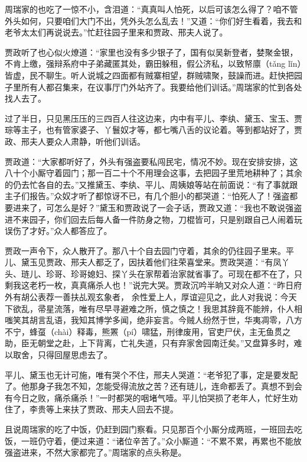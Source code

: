 \documentclass[12pt,oneside]{book}
\begin{document}
周瑞家的也吃了一惊不小，含泪道：“真真叫人怕死，以后可该怎么得了？咱不管外头如何，只要咱们大门不出，凭外头怎么乱去！”又道：“你们好生看着，我去和老爷太太们再说说去。”忙赶往园子里来和贾政、邢夫人说了。

贾政听了也心似火燎道：“家里也没有多少银子了，国有似吴新登者，婪聚金银，不肯上缴，强辩系府中子弟藏匿其处，霸田躲租，假公济私，以致帑廪（tǎng lǐn）皆虚，民不聊生。听人说城之四面都有贼寨相望，群贼啸聚，鼓譟而进。赶快把园子里所有人都召集来，在议事厅门外站齐了。我要给他们训话。”周瑞家的忙到各处找人去了。

过了半日，只见黑压压的三四百人往这边来，内中有平儿、李纨、黛玉、宝玉、贾琮等主子，也有管家婆子、丫鬟奴才等，都七嘴八舌的议论着。等到都站好了，贾政、邢夫人要众人肃静，听他们训话。

贾政道：“大家都听好了，外头有强盗要私闯民宅，情况不妙。现在安排安排，这八十个小厮守着园门；那一百二十个不用理会这事，去把园子里荒地耕种了；其余的仍去忙各自的去。”又推黛玉、李纨、平儿、周姨娘等站在前面说：“有了事就跟主子们报告。”众奴才听了都惊讶不已，有几个胆小的都哭道：“怕死人了！强盗都要进来了，可怎么是好？”黛玉和贾政说了一会子话，贾政又道：“我也不敢说强盗进不来园子，你们回去后每人备一件防身之物，刀棍皆可，只是别跟自己人闹着玩误伤了才好。”众人都答应了。

贾政一声令下，众人散开了。那八十个自去园门守着，其余的仍往园子里来。平儿、黛玉见贾政、邢夫人都乏了，因扶着他们往荣喜堂来。贾政哭道：“有凤丫头、琏儿、珍哥、珍哥媳妇、探丫头在家帮着治家就省事了。可现在都不在了，只剩我这老朽一枚，真真痛杀人也！”说完大哭。贾政沉吟半晌又对众人道：“昨日府外有胡公表荐一善扶乩观玄象者， 余性爱上人，厚谊迎见之，此人对我说：今天下欲乱，帚星流落，唯有尽早寻避难之所，慎之慎之！我思其辞竟不能辨，仆人相嗤笑其胡言乱语，我知其博学多闻，绝非妄言。今贼人纷然于世，华夷凋零，八方不宁，蜂虿（chài）释毒，熊罴（pí）啸猛，刑律废用，官吏尸伏，主无鱼贯之助，臣无朝堂之赴，上下背离，亡礼失道，只有弃家舍园南迁矣。”又盘算多时，难以取舍，只得回屋思虑去了。

平儿、黛玉也无计可施，唯有哭个不住，邢夫人哭道：“老爷犯了事，定是要发配了。他那身子我怎不知，怎能受得流放之苦？还有琏儿，连命都丢了。真想不到会有今日之败，痛杀痛杀！”一时都哭的咽堵气噎。平儿怕哭损了老年人，忙好生劝住了，李贵等上来扶了贾政、邢夫人回去不提。

且说周瑞家的吃了中饭，仍赶到园门察看。只见那百个小厮分成两班，一班回去吃饭，一班仍守着，便过来道：“诸位辛苦了。”众小厮道：“不累不累，再累也不能放强盗进来，不然大家都完了。”周瑞家的点头称是。
\end{document}
